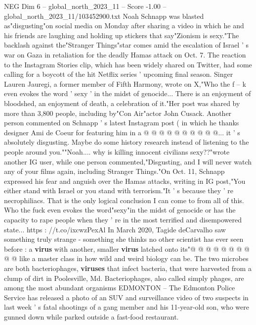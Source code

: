 \begin{textsample}{NEG Dim 6 – global\_north\_2023\_11 – Score -1.00 – global\_north\_2023\_11/103452900.txt}  \label{ex:f6_neg_206}
Noah Schnapp was blasted as"disgusting"on social media on Monday after sharing a video in which he and his friends are laughing and holding up stickers that say"Zionism is sexy."The backlash against the"Stranger Things"star comes amid the escalation of Israel ' s war on Gaza in retaliation for the deadly Hamas attack on Oct. 7.
The reaction to the Instagram Stories clip, which has been widely shared on Twitter, had some calling for a boycott of the hit Netflix series ' upcoming final season.
Singer Lauren Jauregi, a former member of Fifth Harmony, wrote on X,"Who the f -- k even evokes the word ' sexy ' in the midst of genocide...
There is an enjoyment of bloodshed, an enjoyment of death, a celebration of it."Her post was shared by more than 3,800 people, including by"Con Air"actor John Cusack.
Another person commented on Schnapp ' s latest Instagram post ( in which he thanks designer Ami de Coeur for featuring him in a @ @ @ @ @ @ @ @ @ @... it ' s absolutely disgusting.
Maybe do some history research instead of listening to the people around you.""Noah.... why is killing innocent civilians sexy??"wrote another IG user, while one person commented,"Disgusting, and I will never watch any of your films again, including Stranger Things."On Oct. 11, Schnapp expressed his fear and anguish over the Hamas attacks, writing in IG post,"You either stand with Israel or you stand with terrorism."It ' s because they ' re necrophiliacs.
That is the only logical conclusion I can come to from all of this.
Who the fuck even evokes the word"sexy"in the midst of genocide or has the capacity to rape people when they ' re in the most terrified and disempowered state... https : //t.co/ixcwzPexAl In March 2020, Tagide deCarvalho saw something truly strange - something she thinks no other scientist has ever seen before : a \textbf{virus} with another, smaller \textbf{virus} latched onto its"@ @ @ @ @ @ @ @ @ @ like a master class in how wild and weird biology can be.
The two microbes are both bacteriophages, \textbf{viruses} that infect bacteria, that were harvested from a clump of dirt in Poolesville, Md.
Bacteriophages, also called simply phages, are among the most abundant organisms EDMONTON -- The Edmonton Police Service has released a photo of an SUV and surveillance video of two suspects in last week ' s fatal shootings of a gang member and his 11-year-old son, who were gunned down while parked outside a fast-food restaurant.

\end{textsample}
